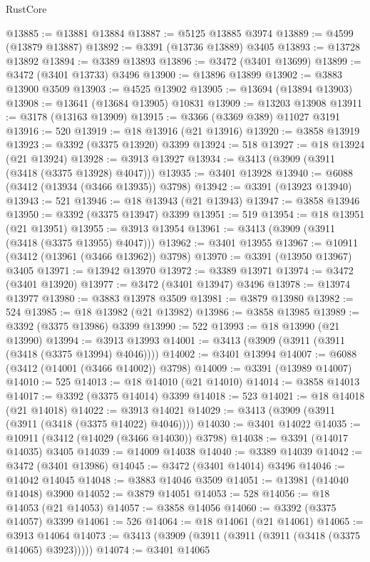 \begin{lexlean}{RustCore}
\begin{coremodule}
@13885 := @13881 @13884
@13887 := @5125 @13885 @3974
@13889 := @4599 (@13879 @13887)
@13892 := @3391 (@13736 @13889) @3405
@13893 := @13728 @13892
@13894 := @3389 @13893
@13896 := @3472 (@3401 @13699)
@13899 := @3472 (@3401 @13733) @3496
@13900 := @13896 @13899
@13902 := @3883 @13900 @3509
@13903 := @4525 @13902
@13905 := @13694 (@13894 @13903)
@13908 := @13641 (@13684 @13905) @10831
@13909 := @13203 @13908
@13911 := @3178 (@13163 @13909)
@13915 := @3366 (@3369 @389) @11027 @3191
@13916 := 520
@13919 := @18 @13916 (@21 @13916)
@13920 := @3858 @13919
@13923 := @3392 (@3375 @13920) @3399
@13924 := 518
@13927 := @18 @13924 (@21 @13924)
@13928 := @3913 @13927
@13934 := @3413 (@3909 (@3911 (@3418 (@3375 @13928) @4047)))
@13935 := @3401 @13928
@13940 := @6088 (@3412 (@13934 (@3466 @13935)) @3798)
@13942 := @3391 (@13923 @13940)
@13943 := 521
@13946 := @18 @13943 (@21 @13943)
@13947 := @3858 @13946
@13950 := @3392 (@3375 @13947) @3399
@13951 := 519
@13954 := @18 @13951 (@21 @13951)
@13955 := @3913 @13954
@13961 := @3413 (@3909 (@3911 (@3418 (@3375 @13955) @4047)))
@13962 := @3401 @13955
@13967 := @10911 (@3412 (@13961 (@3466 @13962)) @3798)
@13970 := @3391 (@13950 @13967) @3405
@13971 := @13942 @13970
@13972 := @3389 @13971
@13974 := @3472 (@3401 @13920)
@13977 := @3472 (@3401 @13947) @3496
@13978 := @13974 @13977
@13980 := @3883 @13978 @3509
@13981 := @3879 @13980
@13982 := 524
@13985 := @18 @13982 (@21 @13982)
@13986 := @3858 @13985
@13989 := @3392 (@3375 @13986) @3399
@13990 := 522
@13993 := @18 @13990 (@21 @13990)
@13994 := @3913 @13993
@14001 := @3413 (@3909 (@3911 (@3911 (@3418 (@3375 @13994) @4046))))
@14002 := @3401 @13994
@14007 := @6088 (@3412 (@14001 (@3466 @14002)) @3798)
@14009 := @3391 (@13989 @14007)
@14010 := 525
@14013 := @18 @14010 (@21 @14010)
@14014 := @3858 @14013
@14017 := @3392 (@3375 @14014) @3399
@14018 := 523
@14021 := @18 @14018 (@21 @14018)
@14022 := @3913 @14021
@14029 := @3413 (@3909 (@3911 (@3911 (@3418 (@3375 @14022) @4046))))
@14030 := @3401 @14022
@14035 := @10911 (@3412 (@14029 (@3466 @14030)) @3798)
@14038 := @3391 (@14017 @14035) @3405
@14039 := @14009 @14038
@14040 := @3389 @14039
@14042 := @3472 (@3401 @13986)
@14045 := @3472 (@3401 @14014) @3496
@14046 := @14042 @14045
@14048 := @3883 @14046 @3509
@14051 := @13981 (@14040 @14048) @3900
@14052 := @3879 @14051
@14053 := 528
@14056 := @18 @14053 (@21 @14053)
@14057 := @3858 @14056
@14060 := @3392 (@3375 @14057) @3399
@14061 := 526
@14064 := @18 @14061 (@21 @14061)
@14065 := @3913 @14064
@14073 := @3413 (@3909 (@3911 (@3911 (@3911 (@3418 (@3375 @14065) @3923)))))
@14074 := @3401 @14065

\end{coremodule}
\end{lexlean}
